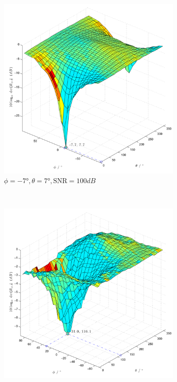 \begin{figure}
\begin{subfigure}[b]{0.48\textwidth}
                \centering
                \includegraphics[width=\textwidth]{images/02_Konzeptionierung/Sim_voice_Phi_-7_Theta_7_SNR_100dB_log}
                \caption{$\phi=-7°,\theta=7°, \mathrm{SNR}=100dB$}
                \label{fig:Sim_Phi_-7_Theta_7_dB}
        \end{subfigure}
        ~ %
        \begin{subfigure}[b]{0.48\textwidth}
                \centering
                \includegraphics[width=\textwidth]{images/02_Konzeptionierung/Sim_voice_Phi_30_Theta_120_SNR_5dB_log}

\end{subfigure}
\end{figure}
